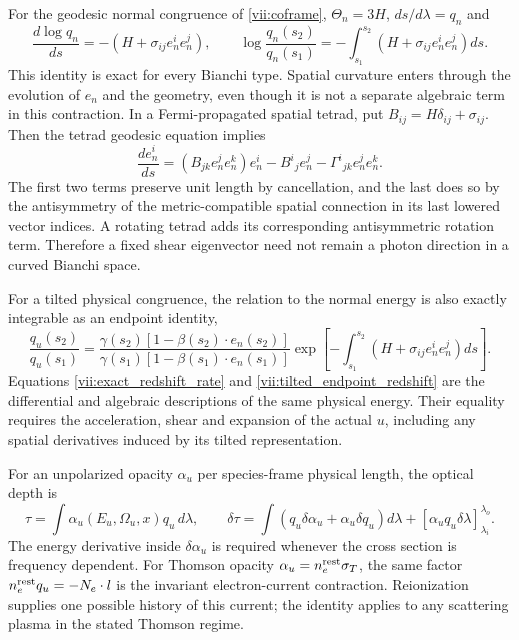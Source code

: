 For the geodesic normal congruence of \eqref{vii:coframe}, $\Theta_n=3H$, $ds/d\lambda=q_n$ and
\begin{equation}\label{vii:normal_redshift_rate}
\frac{d\log q_n}{ds}=-(H+\sigma_{ij}e_n^ie_n^j),\qquad
\log\frac{q_n(s_2)}{q_n(s_1)}=-\int_{s_1}^{s_2}(H+\sigma_{ij}e_n^ie_n^j)ds.
\end{equation}
This identity is exact for every Bianchi type. Spatial curvature enters through the evolution of $e_n$ and the geometry, even though it is not a separate algebraic term in this contraction. In a Fermi-propagated spatial tetrad, put $B_{ij}=H\delta_{ij}+\sigma_{ij}$. Then the tetrad geodesic equation implies
\begin{equation}\label{vii:normal_direction_rate}
\frac{de_n^i}{ds}=(B_{jk}e_n^je_n^k)e_n^i-B^i{}_je_n^j
-\Gamma^i{}_{jk}e_n^je_n^k.
\end{equation}
The first two terms preserve unit length by cancellation, and the last does so by the antisymmetry of the metric-compatible spatial connection in its last lowered vector indices. A rotating tetrad adds its corresponding antisymmetric rotation term. Therefore a fixed shear eigenvector need not remain a photon direction in a curved Bianchi space.

For a tilted physical congruence, the relation to the normal energy is also exactly integrable as an endpoint identity,
\begin{equation}\label{vii:tilted_endpoint_redshift}
\frac{q_u(s_2)}{q_u(s_1)}=
\frac{\gamma(s_2)[1-\beta(s_2)\cdot e_n(s_2)]}
{\gamma(s_1)[1-\beta(s_1)\cdot e_n(s_1)]}
\exp\!\left[-\int_{s_1}^{s_2}(H+\sigma_{ij}e_n^ie_n^j)ds\right].
\end{equation}
Equations \eqref{vii:exact_redshift_rate} and \eqref{vii:tilted_endpoint_redshift} are the differential and algebraic descriptions of the same physical energy. Their equality requires the acceleration, shear and expansion of the actual $u$, including any spatial derivatives induced by its tilted representation.

For an unpolarized opacity $\alpha_u$ per species-frame physical length, the optical depth is
\begin{equation}\label{vii:opacity_clock}
\tau=\int\alpha_u(E_u,\Omega_u,x)q_u\,d\lambda,
\qquad
\delta\tau=\int(q_u\delta\alpha_u+\alpha_u\delta q_u)d\lambda
+[\alpha_uq_u\delta\lambda]_{\lambda_i}^{\lambda_o}.
\end{equation}
The energy derivative inside $\delta\alpha_u$ is required whenever the cross section is frequency dependent. For Thomson opacity $\alpha_u=n_e^{\rm rest}\sigma_T$, the same factor $n_e^{\rm rest}q_u=-N_e\cdot l$ is the invariant electron-current contraction. Reionization supplies one possible history of this current; the identity applies to any scattering plasma in the stated Thomson regime.

